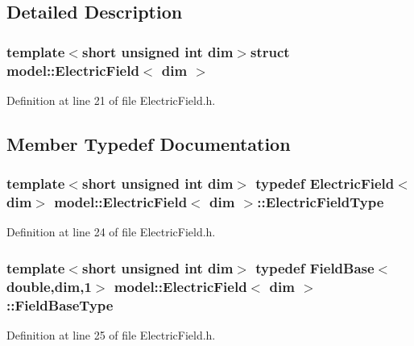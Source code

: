 \subsection{Detailed Description}
\subsubsection*{template$<$short unsigned int dim$>$struct model\+::\+Electric\+Field$<$ dim $>$}



Definition at line 21 of file Electric\+Field.\+h.



\subsection{Member Typedef Documentation}
\hypertarget{structmodel_1_1_electric_field_a514813fa907004b5c1fb1f42b4acbe3f}{}
\subsubsection[{Electric\+Field\+Type}]{\setlength{\rightskip}{0pt plus 5cm}template$<$short unsigned int dim$>$ typedef {\bf Electric\+Field}$<${\bf dim}$>$ {\bf model\+::\+Electric\+Field}$<$ {\bf dim} $>$\+::{\bf Electric\+Field\+Type}}\label{structmodel_1_1_electric_field_a514813fa907004b5c1fb1f42b4acbe3f}


Definition at line 24 of file Electric\+Field.\+h.

\hypertarget{structmodel_1_1_electric_field_a7be4158689bb0a5c8ded48bc18af7ff1}{}
\subsubsection[{Field\+Base\+Type}]{\setlength{\rightskip}{0pt plus 5cm}template$<$short unsigned int dim$>$ typedef {\bf Field\+Base}$<$double,{\bf dim},1$>$ {\bf model\+::\+Electric\+Field}$<$ {\bf dim} $>$\+::{\bf Field\+Base\+Type}}\label{structmodel_1_1_electric_field_a7be4158689bb0a5c8ded48bc18af7ff1}


Definition at line 25 of file Electric\+Field.\+h.


